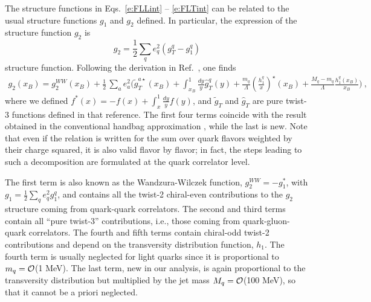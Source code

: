 \documentclass[preprintnumbers,floatfix,nofootinbib]{revtex4}
\newcommand{\xbj}{{x_B}}                   %
\newcommand{\mj}{M_q}
\newcommand{\mq}{m_q}
\begin{document}
The structure functions in Eqs.~\eqref{e:FLLint} -- \eqref{e:FLTint} can be
related to the usual
structure functions $g_1$ and $g_2$ defined. In
particular, the expression of the structure function $g_2$ is
\begin{equation} 
g_2=\frac12 \sum_q e_q^2(g_T^q-g_1^q)
\end{equation}
structure function. Following the derivation in Ref.~\cite{Accardi:2009au}, one finds
\begin{align}
\label{e:g2}
  g_2(\xbj) = g_2^{WW}(\xbj) + \frac{1}{2}\,\sum_a e_a^2
\biggl(
    \widetilde g_T^{a \star}(\xbj) 
    + \int_\xbj^1\frac{dy}{y} \widehat{g}_T^q(y) 
    + \frac{\mq}{\Lambda} \left(\frac{h_1^q}{x}\right)^\star(\xbj) 
    + \frac{\mj-\mq}{\Lambda} \frac{h_1^q(\xbj)}{\xbj} 
\Biggr) \ ,
\end{align}
where we defined $f^*(x) = -f(x) + \int_x^1\frac{dy}{y} f(y)$, and $\tilde g_T$ and $\hat g_T$ are pure twist-3 functions defined in that reference. The first four terms coincide with the result obtained in the conventional handbag
approximation \cite{Accardi:2009au}, while the last is new. Note that even if
the relation is written for the sum over quark flavors weighted by their charge
squared, it is also valid flavor by flavor; in fact, the steps
leading to such a decomposition are formulated at the quark correlator level.

The first term is also known as the Wandzura-Wilczek function, $g_2^{WW} =
-g_1^*$, with $g_1=\frac12 \sum_q e_q^2 g_1^q$, and contains all the twist-2 chiral-even contributions to the $g_2$ structure coming from quark-quark correlators. The second and third
terms contain all ``pure twist-3'' contributions, i.e., those coming from
quark-gluon-quark correlators. The fourth and fifth terms contain chiral-odd twist-2 contributions and depend on the
transversity distribution function, $h_1$. 
The fourth term is usually neglected for
light quarks since it is proportional to $\mq={\cal O}$(1 MeV). The last term,
new in our analysis, is again proportional to the transversity distribution
but multiplied by the jet mass $\mj={\cal O}$(100 MeV), so that it cannot be a priori neglected.
\end{document}
